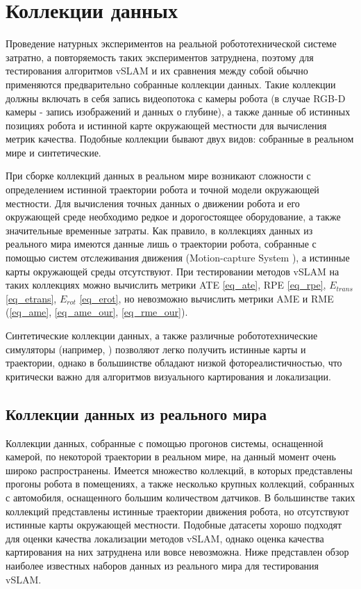 \documentclass{mipt-thesis-ms}
\begin{document}
	\section{Коллекции данных}
	
	 Проведение натурных экспериментов на реальной робототехнической системе затратно, а повторяемость таких экспериментов затруднена, поэтому для тестирования алгоритмов vSLAM и их сравнения между собой обычно применяются предварительно собранные коллекции данных. Такие коллекции должны включать в себя запись видеопотока с камеры робота (в случае RGB-D камеры - запись изображений и данных о глубине), а также данные об истинных позициях робота и истинной карте окружающей местности для вычисления метрик качества. Подобные коллекции бывают двух видов: собранные в реальном мире и синтетические.
	 
	 При сборке коллекций данных в реальном мире возникают сложности с определением истинной траектории робота и точной модели окружающей местности. Для вычисления точных данных о движении робота и его окружающей среде необходимо редкое и дорогостоящее оборудование, а также значительные временные затраты. Как правило, в коллекциях данных из реального мира имеются данные лишь о траектории робота, собранные с помощью систем отслеживания движения (Motion-capture System \cite{kurihara2002optical}), а истинные карты окружающей среды отсутствуют. При тестировании методов vSLAM на таких коллекциях можно вычислить метрики ATE \ref{eq_ate}, RPE \ref{eq_rpe}, $E_{trans}$ \ref{eq_etrans}, $E_{rot}$ \ref{eq_erot}, но невозможно вычислить метрики AME и RME (\ref{eq_ame}, \ref{eq_ame_our}, \ref{eq_rme_our}).
	 
	 Синтетические коллекции данных, а также различные робототехнические симуляторы (например, \cite{koenig2004design} \cite{rooban2021coppeliasim}) позволяют легко получить истинные карты и траектории, однако в большинстве обладают низкой фотореалистичностью, что критически важно для алгоритмов визуального картирования и локализации.
	
	\subsection{Коллекции данных из реального мира}
	
	Коллекции данных, собранные с помощью прогонов системы, оснащенной камерой, по некоторой траектории в реальном мире, на данный момент очень широко распространены. Имеется множество коллекций, в которых представлены прогоны робота в помещениях, а также несколько крупных коллекций, собранных с автомобиля, оснащенного большим количеством датчиков. В большинстве таких коллекций представлены истинные траектории движения робота, но отсутствуют истинные карты окружающей местности. Подобные датасеты хорошо подходят для оценки качества локализации методов vSLAM, однако оценка качества картирования на них затруднена или вовсе невозможна. Ниже представлен обзор наиболее известных наборов данных из реального мира для тестирования vSLAM.
	
\end{document}
